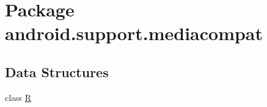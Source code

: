\hypertarget{namespaceandroid_1_1support_1_1mediacompat}{}\section{Package android.\+support.\+mediacompat}
\label{namespaceandroid_1_1support_1_1mediacompat}
\subsection*{Data Structures}
\begin{DoxyCompactItemize}
\item 
class \mbox{\hyperlink{classandroid_1_1support_1_1mediacompat_1_1_r}{R}}
\end{DoxyCompactItemize}

